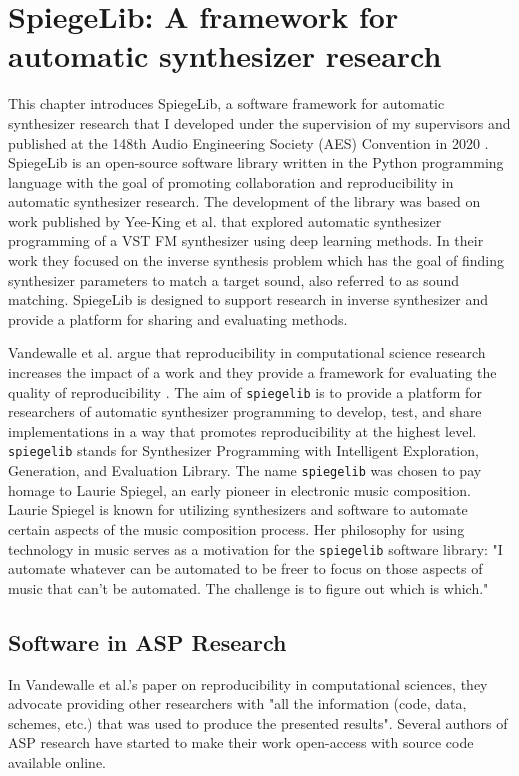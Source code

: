 \chapter{SpiegeLib: A framework for automatic synthesizer research}
\label{chapter:inverse_synth}
This chapter introduces SpiegeLib, a software framework for automatic synthesizer research that I developed under the supervision of my supervisors and published at the 148th Audio Engineering Society (AES) Convention in 2020 \cite{shier2020spiegelib}. SpiegeLib is an open-source software library written in the Python programming language with the goal of promoting collaboration and reproducibility in automatic synthesizer research. The development of the library was based on work published by Yee-King et al. \cite{yee2018automatic} that explored automatic synthesizer programming of a VST FM synthesizer using deep learning methods. In their work they focused on the inverse synthesis problem which has the goal of finding synthesizer parameters to match a target sound, also referred to as sound matching. SpiegeLib is designed to support research in inverse synthesizer and provide a platform for sharing and evaluating methods.

Vandewalle et al. argue that reproducibility in computational science research increases the impact of a work and they provide a framework for evaluating the quality of reproducibility \cite{vandewalle2009reproducible}. The aim of \texttt{spiegelib} is to provide a platform for researchers of automatic synthesizer programming to develop, test, and share implementations in a way that promotes reproducibility at the highest level. \texttt{spiegelib} stands for Synthesizer Programming with Intelligent Exploration, Generation, and Evaluation Library. The name \texttt{spiegelib} was chosen to pay homage to Laurie Spiegel, an early pioneer in electronic music composition. Laurie Spiegel is known for utilizing synthesizers and software to automate certain aspects of the music composition process. Her philosophy for using technology in music serves as a motivation for the \texttt{spiegelib} software library: "I automate whatever can be automated to be freer to focus on those aspects of music that can't be automated. The challenge is to figure out which is which." \cite{hinkle2006women}

\section{Software in ASP Research}
 In Vandewalle et al.'s paper on reproducibility in computational sciences, they advocate providing other researchers with "all the information (code, data, schemes, etc.) that was used to produce the presented results"\cite{vandewalle2009reproducible}. Several authors of ASP research have started to make their work open-access with source code available online. 
 
